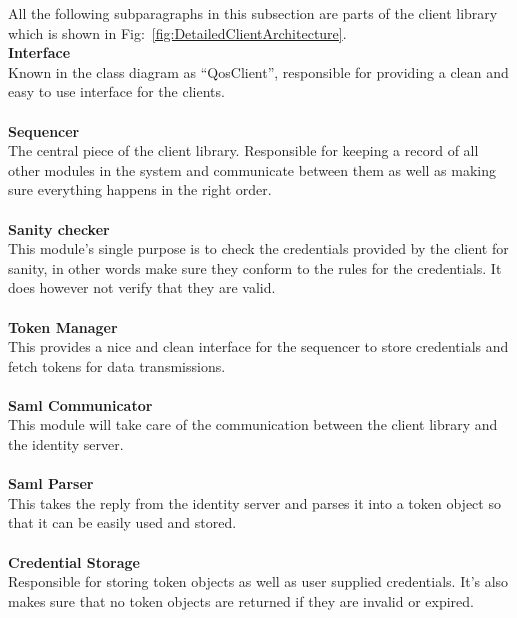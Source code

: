     All the following subparagraphs in this subsection are parts of the client library which is shown in Fig:~\ref{fig:DetailedClientArchitecture}.  \\ 
    
		\indent \textbf{Interface} \\
Known in the class diagram as “QosClient”, responsible for providing a clean and easy to use interface for the clients.
\\\\
		\indent \textbf{Sequencer} \\
The central piece of the client library. Responsible for keeping a record of all other modules in the system and communicate between them as well as making sure everything happens in the right order.
\\\\
		\indent \textbf{Sanity checker} \\
This module's single purpose is to check the credentials provided by the client for sanity, in other words make sure they conform to the rules for the credentials. It does however not verify that they are valid.
\\\\
		\indent \textbf{Token Manager} \\
This provides a nice and clean interface for the sequencer to store credentials and fetch tokens for data transmissions.
\\\\
		\indent \textbf{Saml Communicator} \\
This module will take care of the communication between the client library and the identity server.
\\\\
		\indent \textbf{Saml Parser} \\
This takes the reply from the identity server and parses it into a token object so that it can be easily used and stored.
\\\\
		\indent \textbf{Credential Storage} \\
Responsible for storing token objects as well as user supplied credentials. It's also makes sure that no token objects are returned if they are invalid or expired.

